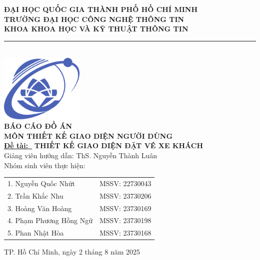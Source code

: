 
\AddCoverBorder


\begin{titlepage}
    \thispagestyle{empty} %
    \vspace*{-1.5cm}
    \centering
    \large
    \textbf{ĐẠI HỌC QUỐC GIA THÀNH PHỐ HỒ CHÍ MINH}\\
    \textbf{TRƯỜNG ĐẠI HỌC CÔNG NGHỆ THÔNG TIN}\\
    \textbf{KHOA KHOA HỌC VÀ KỸ THUẬT THÔNG TIN} \\

    \rule{0.5\textwidth}{1pt}\\[1.2cm]
    \includegraphics[width=4cm]{assets/uit_logo/uit_logo.png}\\[1cm]

    \vspace{2cm}
    {\Large \textbf{BÁO CÁO ĐỒ ÁN \\ [0.5cm]}}
    {\Large \textbf{MÔN THIẾT KẾ GIAO DIỆN NGƯỜI DÙNG} \\[0.5cm]}
    {\underline{\textbf{Đề tài:\ }} \textbf{THIẾT KẾ GIAO DIỆN ĐẶT VÉ XE KHÁCH\\[1.5cm]}}
    {\large Giảng viên hướng dẫn: ThS. Nguyễn Thành Luân \\[1cm]} 
    {\large Nhóm sinh viên thực hiện:}

    \vspace{1cm}
    \centering
    \begin{tabular}{ll}
        1. Nguyễn Quốc Nhứt & MSSV: 22730043\\
        2. Trần Khắc Nhu & MSSV: 23730206\\
        3. Hoàng Văn Hoàng & MSSV: 23730169\\
        4. Phạm Phương Hồng Ngữ & MSSV: 23730198\\
        5. Phan Nhật Hòa & MSSV: 23730168\\
    \end{tabular}

    \vfill
    {\large TP. Hồ Chí Minh, ngày 2 tháng 8 năm 2025}
\end{titlepage}
